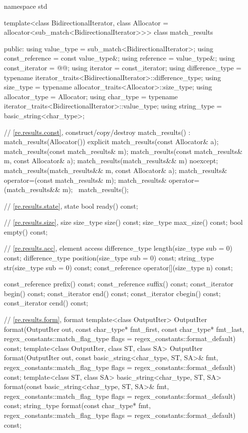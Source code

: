 \begin{codeblock}
namespace std {
  template<class BidirectionalIterator,
           class Allocator = allocator<sub_match<BidirectionalIterator>>>
    class match_results {
    public:
      using value_type      = sub_match<BidirectionalIterator>;
      using const_reference = const value_type&;
      using reference       = value_type&;
      using const_iterator  = @@;
      using iterator        = const_iterator;
      using difference_type =
              typename iterator_traits<BidirectionalIterator>::difference_type;
      using size_type       = typename allocator_traits<Allocator>::size_type;
      using allocator_type  = Allocator;
      using char_type       =
              typename iterator_traits<BidirectionalIterator>::value_type;
      using string_type     = basic_string<char_type>;

      // \ref{re.results.const}, construct/copy/destroy
      match_results() : match_results(Allocator()) {}
      explicit match_results(const Allocator& a);
      match_results(const match_results& m);
      match_results(const match_results& m, const Allocator& a);
      match_results(match_results&& m) noexcept;
      match_results(match_results&& m, const Allocator& a);
      match_results& operator=(const match_results& m);
      match_results& operator=(match_results&& m);
      ~match_results();

      // \ref{re.results.state}, state
      bool ready() const;

      // \ref{re.results.size}, size
      size_type size() const;
      size_type max_size() const;
      bool empty() const;

      // \ref{re.results.acc}, element access
      difference_type length(size_type sub = 0) const;
      difference_type position(size_type sub = 0) const;
      string_type str(size_type sub = 0) const;
      const_reference operator[](size_type n) const;

      const_reference prefix() const;
      const_reference suffix() const;
      const_iterator begin() const;
      const_iterator end() const;
      const_iterator cbegin() const;
      const_iterator cend() const;

      // \ref{re.results.form}, format
      template<class OutputIter>
        OutputIter
          format(OutputIter out,
                 const char_type* fmt_first, const char_type* fmt_last,
                 regex_constants::match_flag_type flags = regex_constants::format_default) const;
      template<class OutputIter, class ST, class SA>
        OutputIter
          format(OutputIter out,
                 const basic_string<char_type, ST, SA>& fmt,
                 regex_constants::match_flag_type flags = regex_constants::format_default) const;
      template<class ST, class SA>
        basic_string<char_type, ST, SA>
          format(const basic_string<char_type, ST, SA>& fmt,
                 regex_constants::match_flag_type flags = regex_constants::format_default) const;
      string_type
        format(const char_type* fmt,
               regex_constants::match_flag_type flags = regex_constants::format_default) const;

}}
\end{codeblock}
